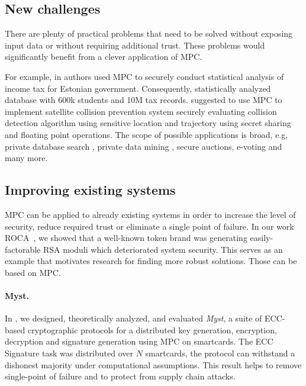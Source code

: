 \documentclass[
  digital, %
  twoside, %
  table,   %
  lof,     %
  lot,     %
]{fithesis3}
\theoremstyle{definition}
\theoremstyle{remark}
\begin{document}
\subsection{New challenges} %
There are plenty of practical problems that need to be solved without exposing input data or without requiring additional trust. These problems would significantly benefit from a clever application of MPC.

For example, in \cite{BJSV15} authors used MPC to securely conduct statistical analysis of income tax for Estonian government. Consequently, \cite{BKKRST16} statistically analyzed database with 600k students and 10M tax records. \cite{KW15} suggested to use MPC to implement satellite collision prevention system securely evaluating collision detection algorithm using sensitive location and trajectory using secret sharing and floating point operations. The scope of possible applications is broad, e.g,  private database search \cite{Bertino2005, Naor:1999:PPA:336992.337028}, private data mining \cite{Aldeen2015}, secure auctions, e-voting and many more.

\subsection{Improving existing systems}
MPC can be applied to already existing systems in order to increase the level of security, reduce required trust or eliminate a single point of failure.
In our work ROCA~\cite{2017-ccs-nemec}, we showed that a well-known token brand was generating easily-factorable RSA moduli which deteriorated system security. This serves as an example that motivates research for finding more robust solutions. Those can be based on MPC.
    
\paragraph{Myst.} In \cite{2017-ccs-mavroudis}, we designed, theoretically analyzed, and evaluated \emph{Myst}, a suite of ECC-based cryptographic protocols for a distributed key generation, encryption, decryption and signature generation using MPC on smartcards.
The ECC Signature task was distributed over $N$ smartcards, the protocol can withstand a dishonest majority under computational assumptions. This result helps to remove single-point of failure and to protect from supply chain attacks.
    
\end{document}
